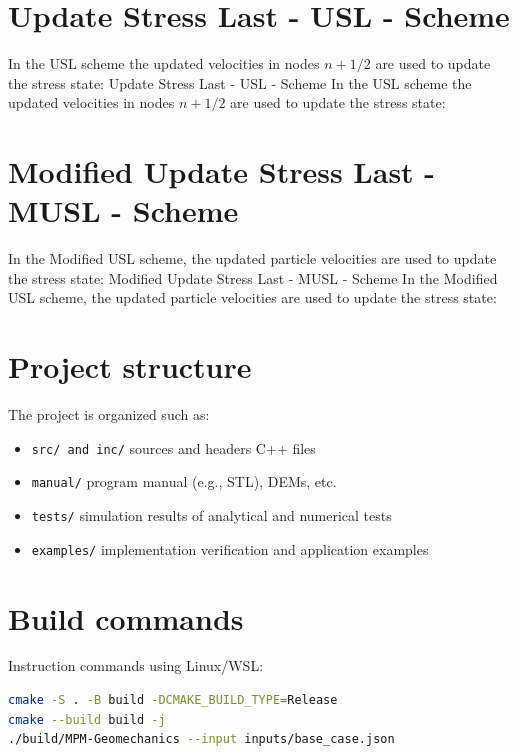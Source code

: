 \documentclass[11pt,a4paper]{article}
\begin{document}
\section{Update Stress Last - USL - Scheme}
In the USL scheme the updated velocities in nodes  $ n+1/2  $ are used to update the stress state:
Update Stress Last - USL - Scheme
In the USL scheme the updated velocities in nodes  $ n+1/2  $ are used to update the stress state:

\section{Modified Update Stress Last - MUSL - Scheme}
In the Modified USL scheme, the updated particle velocities are used to update the stress state: 
Modified Update Stress Last - MUSL - Scheme
In the Modified USL scheme, the updated particle velocities are used to update the stress state: 

\section{Project structure}

The project is organized such as:

\begin{itemize}
  \item \texttt{src/ and inc/} sources and headers C++ files
  \item \texttt{manual/} program manual (e.g., STL), DEMs, etc.
  \item \texttt{tests/} simulation results of analytical and numerical tests
  \item \texttt{examples/} implementation verification and application examples
\end{itemize}

\section{Build commands}

\noindent Instruction commands using Linux/WSL:

\begin{lstlisting}[language=bash]
cmake -S . -B build -DCMAKE_BUILD_TYPE=Release
cmake --build build -j
./build/MPM-Geomechanics --input inputs/base_case.json
\end{lstlisting}
\end{document}
